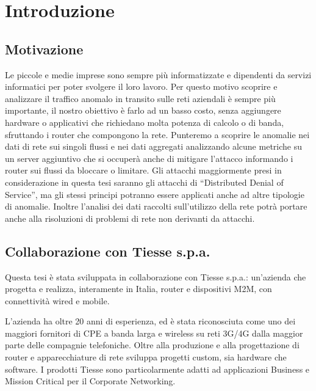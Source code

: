 
\chapter{Introduzione}

\section{Motivazione}

Le piccole e medie imprese sono sempre più informatizzate e dipendenti da servizi informatici per poter svolgere il loro lavoro. Per questo motivo scoprire e analizzare il traffico anomalo in transito sulle reti aziendali è sempre più importante, il nostro obiettivo è farlo ad un basso costo, senza aggiungere hardware o applicativi che richiedano molta potenza di calcolo o di banda, sfruttando i router che compongono la rete. Punteremo a scoprire le anomalie nei dati di rete sui singoli flussi e nei dati aggregati analizzando alcune metriche su un server aggiuntivo che si occuperà anche di mitigare l'attacco informando i router sui flussi da bloccare o limitare.
Gli attacchi maggiormente presi in considerazione in questa tesi saranno gli attacchi di ``Distributed Denial of Service'', ma gli stessi principi potranno essere applicati anche ad altre tipologie di anomalie.
Inoltre l'analisi dei dati raccolti sull'utilizzo della rete potrà portare anche alla risoluzioni di problemi di rete non derivanti da attacchi.

\section{Collaborazione con Tiesse s.p.a.}

Questa tesi è stata sviluppata in collaborazione con Tiesse s.p.a.: un'azienda che progetta e realizza, interamente in Italia, router e dispositivi M2M, con connettività wired e mobile.

L'azienda ha oltre 20 anni di esperienza, ed è stata riconosciuta come uno dei maggiori fornitori di CPE a banda larga e wireless su reti 3G/4G dalla maggior parte delle compagnie telefoniche. Oltre alla produzione e alla progettazione di router e apparecchiature di rete sviluppa progetti custom, sia hardware che software. I prodotti Tiesse sono particolarmente adatti ad applicazioni Business e Mission Critical per il Corporate Networking.

